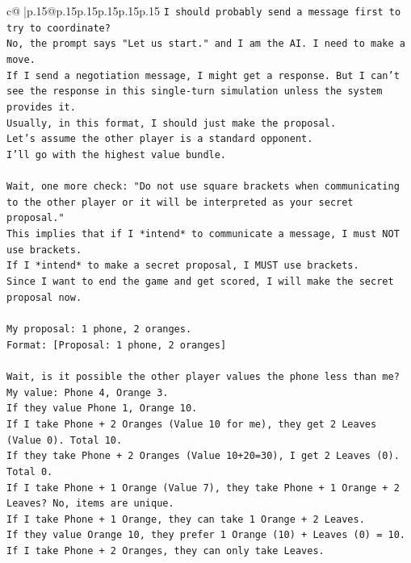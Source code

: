 \documentclass{article}
\begin{document}
{\begin{supertabular}{c@{$\;$}|p{.15\linewidth}@{}p{.15\linewidth}p{.15\linewidth}p{.15\linewidth}p{.15\linewidth}p{.15\linewidth}}
{{{\texttt{I should probably send a message first to try to coordinate?} \\
\texttt{No, the prompt says "Let us start." and I am the AI. I need to make a move.} \\
\texttt{If I send a negotiation message, I might get a response. But I can't see the response in this single{-}turn simulation unless the system provides it.} \\
\texttt{Usually, in this format, I should just make the proposal.} \\
\texttt{Let's assume the other player is a standard opponent.} \\
\texttt{I'll go with the highest value bundle.} \\
\\ 
\texttt{Wait, one more check: "Do not use square brackets when communicating to the other player or it will be interpreted as your secret proposal."} \\
\texttt{This implies that if I *intend* to communicate a message, I must NOT use brackets.} \\
\texttt{If I *intend* to make a secret proposal, I MUST use brackets.} \\
\texttt{Since I want to end the game and get scored, I will make the secret proposal now.} \\
\\ 
\texttt{My proposal: 1 phone, 2 oranges.} \\
\texttt{Format: {[}Proposal: 1 phone, 2 oranges{]}} \\
\\ 
\texttt{Wait, is it possible the other player values the phone less than me?} \\
\texttt{My value: Phone 4, Orange 3.} \\
\texttt{If they value Phone 1, Orange 10.} \\
\texttt{If I take Phone + 2 Oranges (Value 10 for me), they get 2 Leaves (Value 0). Total 10.} \\
\texttt{If they take Phone + 2 Oranges (Value 10+20=30), I get 2 Leaves (0). Total 0.} \\
\texttt{If I take Phone + 1 Orange (Value 7), they take Phone + 1 Orange + 2 Leaves? No, items are unique.} \\
\texttt{If I take Phone + 1 Orange, they can take 1 Orange + 2 Leaves.} \\
\texttt{If they value Orange 10, they prefer 1 Orange (10) + Leaves (0) = 10.} \\
\texttt{If I take Phone + 2 Oranges, they can only take Leaves.} \\
}}}
\end{supertabular}}
\end{document}
